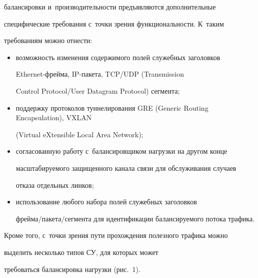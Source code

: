 балансировки и~производительности предъявляются дополнительные 


специфические требования с~точки зрения функциональности. К~таким 


требованиям можно отнести:


  \begin{itemize}


\item возможность изменения содержимого полей служебных заголовков 


Ethernet-фрей\-ма, IP-па\-ке\-та, TCP\!/\!UDP (Transmission


Control Protocol/User Datagram Protocol) сег\-мента;


\item поддержку протоколов туннелирования GRE (Generic Routing Encapsulation), VXLAN


(Virtual eXtensible Local Area Network);


\item согласованную работу с~балансировщиком нагрузки на другом конце 


масштабируемого защищенного канала связи для обслуживания случаев 


отказа отдельных линков;


\item использование любого набора полей служебных заголовков 


фрей\-ма\!/\!па\-ке\-та\!/\!сегмента для идентификации балансируемого потока трафика.


\end{itemize}





  Кроме того, с~точки зрения пути прохождения полезного трафика можно 


выделить несколько типов СУ, для которых может 


требоваться балансировка нагрузки (рис.~1).


  





